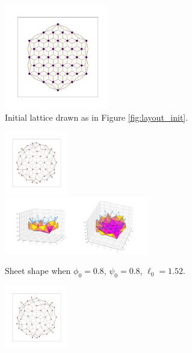 \documentclass[draft]{article}
\begin{document}
\begin{figure}[htbp]
    \centering
    \begin{subfigure}[b]{\textwidth}
        \centering
        \includegraphics[width=0.5\textwidth]{figures/numerical/hexbig/hexbig_graph.png}
        \caption{Initial lattice drawn as in Figure \ref{fig:layout_init}.}
        \label{subfig:hexbig_graph}
    \end{subfigure}
    \begin{subfigure}[b]{\textwidth}
        \centering
        \includegraphics[width=0.3\textwidth]{figures/numerical/hexbig/hexbig0.8_0.8_1.35_10_graph.png}
        \includegraphics[width=0.69\textwidth]{figures/numerical/hexbig/hexbig0.8_0.8_1.35_10_plot.png}
        \caption{Sheet shape when $\phi_0=0.8$, $\psi_0=0.8$, $\ell_0=1.52$.}
        \label{subfig:hexbig_in}
    \end{subfigure}
    \begin{subfigure}[b]{\textwidth}
        \centering
        \includegraphics[width=0.3\textwidth]{figures/numerical/hexbig/hexbig0.95_0.8_1.35_10_graph.png}

\end{subfigure}
\end{figure}
\end{document}
